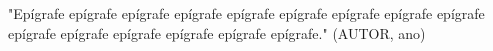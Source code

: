 
\begin{epigrafe}
"Epígrafe epígrafe epígrafe epígrafe epígrafe epígrafe epígrafe epígrafe epígrafe epígrafe epígrafe epígrafe epígrafe epígrafe epígrafe." (AUTOR, ano)
\end{epigrafe}
